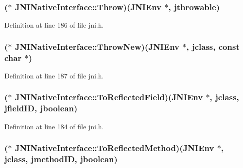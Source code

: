 \hypertarget{struct_j_n_i_native_interface_a69064bd2d544dd183aa05824380746e0}{
\subsubsection[{Throw}]{($\ast$ J\-N\-I\-Native\-Interface\-::\-Throw)({\bf J\-N\-I\-Env} $\ast$, {\bf jthrowable})}}\label{struct_j_n_i_native_interface_a69064bd2d544dd183aa05824380746e0}


Definition at line 186 of file jni.\-h.

\hypertarget{struct_j_n_i_native_interface_a51c48b249a30a99528a24a3a49a01294}{
\subsubsection[{Throw\-New}]{($\ast$ J\-N\-I\-Native\-Interface\-::\-Throw\-New)({\bf J\-N\-I\-Env} $\ast$, {\bf jclass}, const char $\ast$)}}\label{struct_j_n_i_native_interface_a51c48b249a30a99528a24a3a49a01294}


Definition at line 187 of file jni.\-h.

\hypertarget{struct_j_n_i_native_interface_adba06951339cf7726986310a70325029}{
\subsubsection[{To\-Reflected\-Field}]{($\ast$ J\-N\-I\-Native\-Interface\-::\-To\-Reflected\-Field)({\bf J\-N\-I\-Env} $\ast$, {\bf jclass}, {\bf jfield\-I\-D}, {\bf jboolean})}}\label{struct_j_n_i_native_interface_adba06951339cf7726986310a70325029}


Definition at line 184 of file jni.\-h.

\hypertarget{struct_j_n_i_native_interface_a5b2c3cbad0a98782fb66f548986ad88c}{
\subsubsection[{To\-Reflected\-Method}]{($\ast$ J\-N\-I\-Native\-Interface\-::\-To\-Reflected\-Method)({\bf J\-N\-I\-Env} $\ast$, {\bf jclass}, {\bf jmethod\-I\-D}, {\bf jboolean})}}\label{struct_j_n_i_native_interface_a5b2c3cbad0a98782fb66f548986ad88c}



